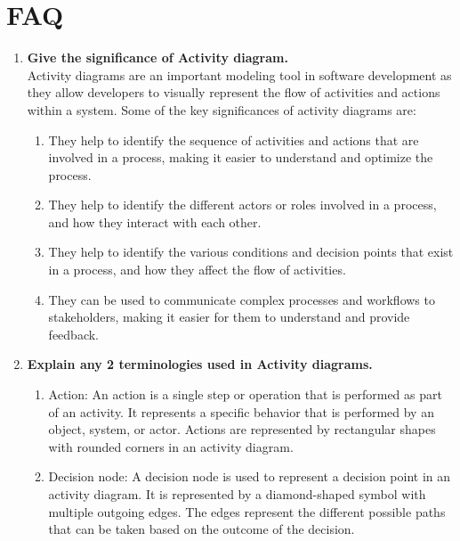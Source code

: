 \documentclass[11pt]{article}
\begin{document}
\section{FAQ}
\begin{enumerate}
	\item \textbf{Give the significance of Activity diagram.}\\

	      Activity diagrams are an important modeling tool in software development as they allow developers to visually represent the flow of activities and actions within a system. Some of the key significances of activity diagrams are:

	      \begin{enumerate}
		      \item They help to identify the sequence of activities and actions that are involved in a process, making it easier to understand and optimize the process.
		      \item They help to identify the different actors or roles involved in a process, and how they interact with each other.
		      \item They help to identify the various conditions and decision points that exist in a process, and how they affect the flow of activities.
		      \item They can be used to communicate complex processes and workflows to stakeholders, making it easier for them to understand and provide feedback.
	      \end{enumerate}

	\item \textbf{Explain any 2 terminologies used in Activity diagrams.}\\

	      \begin{enumerate}
		      \item Action: An action is a single step or operation that is performed as part of an activity. It represents a specific behavior that is performed by an object, system, or actor. Actions are represented by rectangular shapes with rounded corners in an activity diagram.
		      \item Decision node: A decision node is used to represent a decision point in an activity diagram. It is represented by a diamond-shaped symbol with multiple outgoing edges. The edges represent the different possible paths that can be taken based on the outcome of the decision.
	      \end{enumerate}


\end{enumerate}
\end{document}
